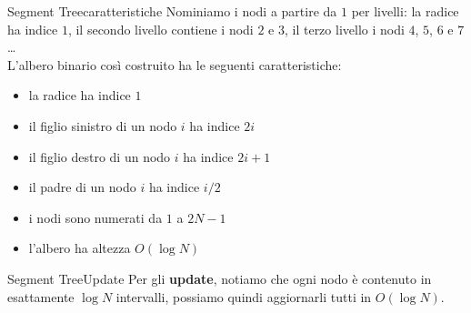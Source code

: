 \documentclass[compress]{beamer}
\begin{document}
\begin{frame}{Segment Tree}{caratteristiche}
    Nominiamo i nodi a partire da $1$ per livelli: la radice ha indice $1$, il secondo livello contiene i nodi $2$ e $3$, il terzo livello i nodi $4$, $5$, $6$ e $7$ \dots\\
    \pause
    L'albero binario cos\`i costruito ha le seguenti caratteristiche:
    \begin{itemize}
        \item la radice ha indice $1$
        \item il figlio sinistro di un nodo $i$ ha indice $2i$
        \item il figlio destro di un nodo $i$ ha indice $2i + 1$
        \item il padre di un nodo $i$ ha indice $i/2$
        \item i nodi sono numerati da $1$ a $2N - 1$
        \item l'albero ha altezza $O(\log N)$
    \end{itemize}
\end{frame}

\begin{frame}
\end{frame}

\begin{frame}{Segment Tree}{Update}
    Per gli \textbf{update}, notiamo che ogni nodo è contenuto in esattamente $\log N $ intervalli, possiamo quindi aggiornarli tutti in $O(\log N)$.
\end{frame}
\end{document}
